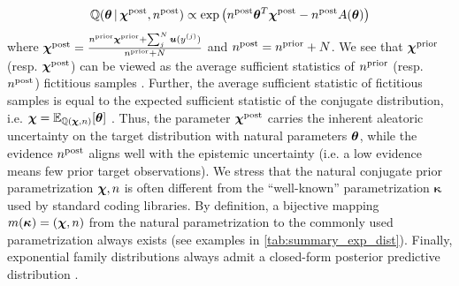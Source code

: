 %
\begin{equation}\label{eq:posterior}
    \operatorname{\mathbb{Q}}(\bm{\theta} \,|\, \bm{\chi}^\text{post}, n^\text{post}) \propto \exp\left( n^\text{post} \bm{\theta}^T\bm{\chi}^\text{post} - n^\text{post} A(\bm{\theta}) \right)
\end{equation}
%
where $\bm{\chi}^\text{post}=\frac{n^\text{prior} \bm{\chi}^\text{prior}+ \sum_{j}^N{\bm{u}(y^{(j)})}}{n^\text{prior} + N}$ and $n^\text{post}=n^\text{prior} + N$. We see that $\bm{\chi}^{\text{prior}}$ (resp. $\bm{\chi}^{\text{post}}$) can be viewed as the average sufficient statistics of $n^{\text{prior}}$ (resp. $n^{\text{post}}$) fictitious samples \citep{bishop}. 
Further, the average sufficient statistic of fictitious samples is equal to the expected sufficient statistic of the conjugate distribution, i.e. $\bm{\chi} = \operatorname{\mathbb{E}}_{\operatorname{\mathbb{Q}}(\bm{\chi}, n)}[\bm{\theta}]$ \citep{exponential-family-stats, conjugate-prior-exponential-family}. Thus, the parameter $\bm{\chi}^\text{post}$ carries the inherent aleatoric uncertainty on the target distribution with natural parameters $\bm{\theta}$, while the evidence $n^\text{post}$ aligns well with the epistemic uncertainty (i.e. a low evidence means few prior target observations). We stress that the natural conjugate prior parametrization $\bm{\chi}, n$ is often different from the ``well-known'' parametrization $\bm{\kappa}$ used by standard coding libraries. By definition, a bijective mapping $m(\bm{\kappa}) = (\bm{\chi}, n)$ from the natural parametrization to the commonly used parametrization always exists (see examples in \cref{tab:summary_exp_dist}). Finally, exponential family distributions always admit a closed-form posterior predictive distribution \citep{bayesian-data-analysis}.

